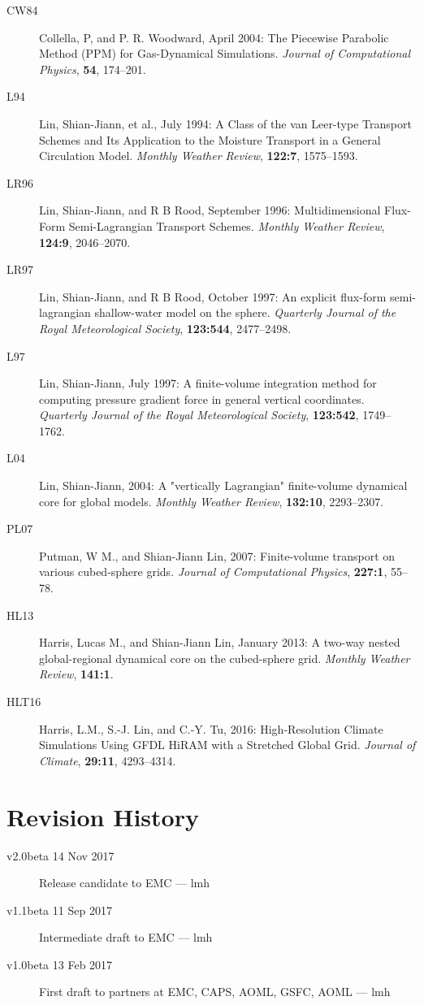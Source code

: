 \documentclass[12pt,letterpaper]{book}
\begin{document}
\begin{description}
\item[CW84] Collella, P, and P. R. Woodward, April 2004: The Piecewise Parabolic Method (PPM) for Gas-Dynamical Simulations. \textit{Journal of Computational Physics}, \textbf{54}, 174--201.
\item[L94] Lin, Shian-Jiann, et al., July 1994: A Class of the van Leer-type Transport Schemes and Its Application to the Moisture Transport in a General Circulation Model. \textit{Monthly Weather Review}, \textbf{122:7}, 1575--1593.
\item[LR96] Lin, Shian-Jiann, and R B Rood, September 1996: Multidimensional Flux-Form Semi-Lagrangian Transport Schemes. \textit{Monthly Weather Review}, \textbf{124:9}, 2046--2070. 
\item[LR97] Lin, Shian-Jiann, and R B Rood, October 1997: An explicit flux-form semi-lagrangian shallow-water model on the sphere. \textit{Quarterly Journal of the Royal Meteorological Society}, \textbf{123:544}, 2477--2498.
\item[L97] Lin, Shian-Jiann, July 1997: A finite-volume integration method for computing pressure gradient force in general vertical coordinates. \textit{Quarterly Journal of the Royal Meteorological Society}, \textbf{123:542}, 1749--1762.
\item[L04] Lin, Shian-Jiann, 2004: A "vertically Lagrangian" finite-volume dynamical core for global models. \textit{Monthly Weather Review}, \textbf{132:10}, 2293--2307. 
\item[PL07] Putman, W M., and Shian-Jiann Lin, 2007: Finite-volume transport on various cubed-sphere grids. \textit{ Journal of Computational Physics}, \textbf{227:1}, 55--78. 
\item[HL13] Harris, Lucas M., and Shian-Jiann Lin, January 2013: A two-way nested global-regional dynamical core on the cubed-sphere grid. \textit{Monthly Weather Review}, \textbf{141:1}. 
\item[HLT16] Harris, L.M., S.-J. Lin, and C.-Y. Tu, 2016: High-Resolution Climate Simulations Using GFDL HiRAM with a Stretched Global Grid. \textit{Journal of Climate}, \textbf{29:11}, 4293--4314.
\end{description}

\section{Revision History}

\begin{description}
\item[v2.0beta 14 Nov 2017] Release candidate to EMC --- lmh
\item[v1.1beta 11 Sep 2017] Intermediate draft to EMC --- lmh
\item[v1.0beta 13 Feb 2017] First draft to partners at EMC, CAPS, AOML, GSFC, AOML --- lmh


\end{description}
\end{document}
